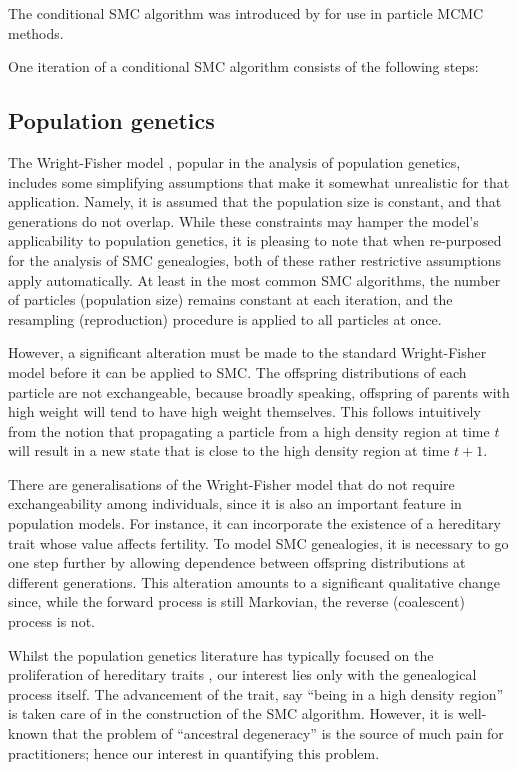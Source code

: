 \documentclass{article}
\begin{document}
The conditional SMC algorithm was introduced by \citet{andrieu2010} for use in particle MCMC methods. %

One iteration of a conditional SMC algorithm consists of the following steps:





\subsection{Population genetics}
The Wright-Fisher model \citep[Chapter 3]{wakeley2009}, popular in the analysis of population genetics, includes some simplifying assumptions that make it somewhat unrealistic for that application. Namely, it is assumed that the population size is constant, and that generations do not overlap. 
While these constraints may hamper the model's applicability to population genetics, it is pleasing to note that when re-purposed for the analysis of SMC genealogies, both of these rather restrictive assumptions apply automatically. At least in the most common SMC algorithms, the number of particles (population size) remains constant at each iteration, and the resampling (reproduction) procedure is applied to all particles at once.

However, a significant alteration must be made to the standard Wright-Fisher model before it can be applied to SMC. The offspring distributions of each particle are not exchangeable, because broadly speaking, offspring of parents with high weight will tend to have high weight themselves. This follows intuitively from the notion that propagating a particle from a high density region at time $t$ will result in a new state that is close to the high density region at time $t+1$.

There are generalisations of the Wright-Fisher model that do not require exchangeability among individuals, since it is also an important feature in population models. For instance, it can incorporate the existence of a hereditary trait whose value affects fertility. To model SMC genealogies, it is necessary to go one step further by allowing dependence between offspring distributions at different generations. This alteration amounts to a significant qualitative change since, while the forward process is still Markovian, the reverse (coalescent) process is not.

Whilst the population genetics literature has typically focused on the proliferation of hereditary traits \citep[Chapter 3]{wakeley2009}, our interest lies only with the genealogical process itself. The advancement of the trait, say ``being in a high density region'' is taken care of in the construction of the SMC algorithm. However, it is well-known that the problem of ``ancestral degeneracy'' is the source of much pain for practitioners; hence our interest in quantifying this problem.
\end{document}

